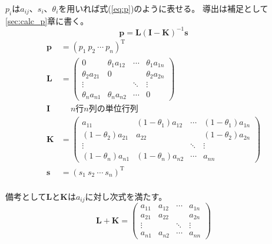 \documentclass{jarticle}
\numberwithin{equation}{section}
\numberwithin{table}{section}
\numberwithin{figure}{section}
\theoremstyle{plain}
\begin{document}
$p_i$は$a_{i j}$、$s_i$、$\theta_i$を用いれば式(\ref{eq:p})のように表せる。
導出は補足として\ref{sec:calc_p}章に書く。
\begin{equation}
    \label{eq:p}
    \bm{p} =\bm{L}(\bm{I} - \bm{K})^{-1}\bm{s}
\end{equation}
\begin{align*}
    \bm{p} &= (p_1\ p_2\ \cdots\ p_n)^\mathrm{T} \\
    \bm{L} &= \begin{pmatrix}
        0                & \theta_1 a_{1 2} & \cdots & \theta_1 a_{1 n} \\
        \theta_2 a_{2 1} & 0                &        & \theta_2 a_{2 n} \\
        \vdots           &                  & \ddots & \vdots           \\
        \theta_n a_{n 1} & \theta_n a_{n 2} & \cdots & 0
    \end{pmatrix} \\
    \bm{I} & \quad \ \text{$n$行$n$列の単位行列} \\
    \bm{K} &= \begin{pmatrix}
                       a_{1 1} & (1 - \theta_1) a_{1 2} & \cdots & (1 - \theta_1) a_{1 n} \\
        (1 - \theta_2) a_{2 1} &                a_{2 2} &        & (1 - \theta_2) a_{2 n} \\
        \vdots                 &                        & \ddots & \vdots                 \\
        (1 - \theta_n) a_{n 1} & (1 - \theta_n) a_{n 2} & \cdots &                a_{n n}
    \end{pmatrix} \\
    \bm{s} &= (s_1\ s_2\ \cdots\ s_n)^\mathrm{T} \\
\end{align*}

備考として$\bm{L}$と$\bm{K}$は$a_{i j}$に対し次式を満たす。
\begin{equation}
    \label{eq:L+K=A}
    \bm{L} + \bm{K} = \begin{pmatrix}
        a_{1 1} & a_{1 2} & \cdots & a_{1 n} \\
        a_{2 1} & a_{2 2} &        & a_{2 n} \\
        \vdots  &         & \ddots & \vdots  \\
        a_{n 1} & a_{n 2} & \cdots & a_{n n}
    \end{pmatrix}
\end{equation}
\end{document}
